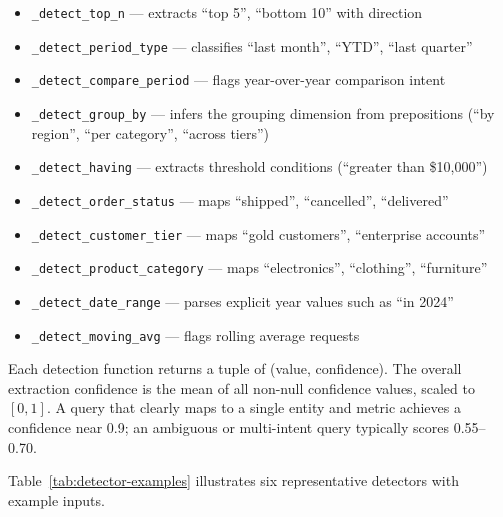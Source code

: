 \documentclass[12pt,a4paper]{report}
\begin{document}
\begin{itemize}[leftmargin=2em]
  \item \texttt{\_detect\_top\_n} — extracts ``top 5'', ``bottom 10'' with direction
  \item \texttt{\_detect\_period\_type} — classifies ``last month'', ``YTD'', ``last quarter''
  \item \texttt{\_detect\_compare\_period} — flags year-over-year comparison intent
  \item \texttt{\_detect\_group\_by} — infers the grouping dimension from prepositions (``by region'', ``per category'', ``across tiers'')
  \item \texttt{\_detect\_having} — extracts threshold conditions (``greater than \$10,000'')
  \item \texttt{\_detect\_order\_status} — maps ``shipped'', ``cancelled'', ``delivered''
  \item \texttt{\_detect\_customer\_tier} — maps ``gold customers'', ``enterprise accounts''
  \item \texttt{\_detect\_product\_category} — maps ``electronics'', ``clothing'', ``furniture''
  \item \texttt{\_detect\_date\_range} — parses explicit year values such as ``in 2024''
  \item \texttt{\_detect\_moving\_avg} — flags rolling average requests
\end{itemize}

Each detection function returns a tuple of (value, confidence). The overall extraction confidence is the mean of all non-null confidence values, scaled to $[0, 1]$. A query that clearly maps to a single entity and metric achieves a confidence near 0.9; an ambiguous or multi-intent query typically scores 0.55--0.70.

Table~\ref{tab:detector-examples} illustrates six representative detectors with example inputs.
\end{document}
